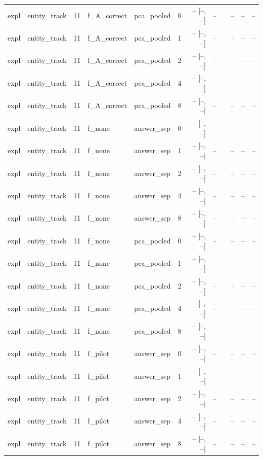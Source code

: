 \begin{tabular}{llrllrrrlrrr}
expl & entity\_track & 11 & f\_A\_correct & pca\_pooled & 0 & -- [--, --] & -- &  & -- & -- & -- \\
expl & entity\_track & 11 & f\_A\_correct & pca\_pooled & 1 & -- [--, --] & -- &  & -- & -- & -- \\
expl & entity\_track & 11 & f\_A\_correct & pca\_pooled & 2 & -- [--, --] & -- &  & -- & -- & -- \\
expl & entity\_track & 11 & f\_A\_correct & pca\_pooled & 4 & -- [--, --] & -- &  & -- & -- & -- \\
expl & entity\_track & 11 & f\_A\_correct & pca\_pooled & 8 & -- [--, --] & -- &  & -- & -- & -- \\
expl & entity\_track & 11 & f\_none & answer\_sep & 0 & -- [--, --] & -- &  & -- & -- & -- \\
expl & entity\_track & 11 & f\_none & answer\_sep & 1 & -- [--, --] & -- &  & -- & -- & -- \\
expl & entity\_track & 11 & f\_none & answer\_sep & 2 & -- [--, --] & -- &  & -- & -- & -- \\
expl & entity\_track & 11 & f\_none & answer\_sep & 4 & -- [--, --] & -- &  & -- & -- & -- \\
expl & entity\_track & 11 & f\_none & answer\_sep & 8 & -- [--, --] & -- &  & -- & -- & -- \\
expl & entity\_track & 11 & f\_none & pca\_pooled & 0 & -- [--, --] & -- &  & -- & -- & -- \\
expl & entity\_track & 11 & f\_none & pca\_pooled & 1 & -- [--, --] & -- &  & -- & -- & -- \\
expl & entity\_track & 11 & f\_none & pca\_pooled & 2 & -- [--, --] & -- &  & -- & -- & -- \\
expl & entity\_track & 11 & f\_none & pca\_pooled & 4 & -- [--, --] & -- &  & -- & -- & -- \\
expl & entity\_track & 11 & f\_none & pca\_pooled & 8 & -- [--, --] & -- &  & -- & -- & -- \\
expl & entity\_track & 11 & f\_pilot & answer\_sep & 0 & -- [--, --] & -- &  & -- & -- & -- \\
expl & entity\_track & 11 & f\_pilot & answer\_sep & 1 & -- [--, --] & -- &  & -- & -- & -- \\
expl & entity\_track & 11 & f\_pilot & answer\_sep & 2 & -- [--, --] & -- &  & -- & -- & -- \\
expl & entity\_track & 11 & f\_pilot & answer\_sep & 4 & -- [--, --] & -- &  & -- & -- & -- \\
expl & entity\_track & 11 & f\_pilot & answer\_sep & 8 & -- [--, --] & -- &  & -- & -- & -- \\

\end{tabular}
